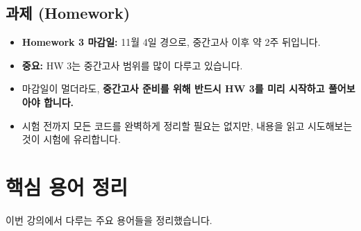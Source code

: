 \documentclass[11pt,a4paper]{book}
\theoremstyle{definition}
\begin{document}
\subsection{과제 (Homework)}
\begin{itemize}
    \item \textbf{Homework 3 마감일:} 11월 4일 경으로, 중간고사 이후 약 2주 뒤입니다.
    \item \textbf{중요:} HW 3는 중간고사 범위를 많이 다루고 있습니다.
    \item 마감일이 멀더라도, \textbf{중간고사 준비를 위해 반드시 HW 3를 미리 시작하고 풀어보아야 합니다.}
    \item 시험 전까지 모든 코드를 완벽하게 정리할 필요는 없지만, 내용을 읽고 시도해보는 것이 시험에 유리합니다.
\end{itemize}


\section{핵심 용어 정리}
이번 강의에서 다루는 주요 용어들을 정리했습니다.
\end{document}
